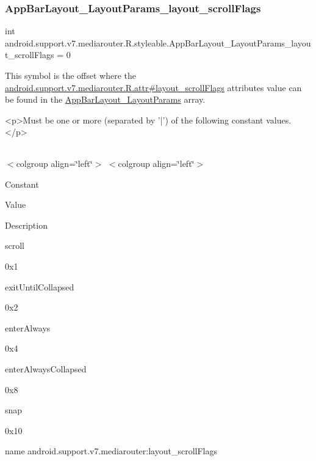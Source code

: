 \subsubsection{\texorpdfstring{App\+Bar\+Layout\+\_\+\+Layout\+Params\+\_\+layout\+\_\+scroll\+Flags}{AppBarLayout\_LayoutParams\_layout\_scrollFlags}}
{\footnotesize\ttfamily int android.\+support.\+v7.\+mediarouter.\+R.\+styleable.\+App\+Bar\+Layout\+\_\+\+Layout\+Params\+\_\+layout\+\_\+scroll\+Flags = 0\hspace{0.3cm}{\ttfamily [static]}}

This symbol is the offset where the \hyperlink{classandroid_1_1support_1_1v7_1_1mediarouter_1_1R_1_1attr_a7ffb7431db8067b52ba477cf40366447}{android.\+support.\+v7.\+mediarouter.\+R.\+attr\#layout\+\_\+scroll\+Flags} attribute\textquotesingle{}s value can be found in the \hyperlink{classandroid_1_1support_1_1v7_1_1mediarouter_1_1R_1_1styleable_ad56052828eb14d75ca60a6e450bcbcd5}{App\+Bar\+Layout\+\_\+\+Layout\+Params} array.

\begin{DoxyVerb}      <p>Must be one or more (separated by '|') of the following constant values.</p>
\end{DoxyVerb}
 \tabulinesep=1mm
\begin{longtabu} spread 0pt [c]{*{0}{|X[-1]}|}
\hline
\end{longtabu}
$<$colgroup align=\char`\"{}left\char`\"{}$>$ $<$colgroup align=\char`\"{}left\char`\"{}$>$ 

Constant

Value

Description 

{\ttfamily scroll}

0x1

{\ttfamily exit\+Until\+Collapsed}

0x2

{\ttfamily enter\+Always}

0x4

{\ttfamily enter\+Always\+Collapsed}

0x8

{\ttfamily snap}

0x10

name android.\+support.\+v7.\+mediarouter\+:layout\+\_\+scroll\+Flags \mbox{\label{classandroid_1_1support_1_1v7_1_1mediarouter_1_1R_1_1styleable_a1c1befc79f0759dda896bed576c263ef}} 
